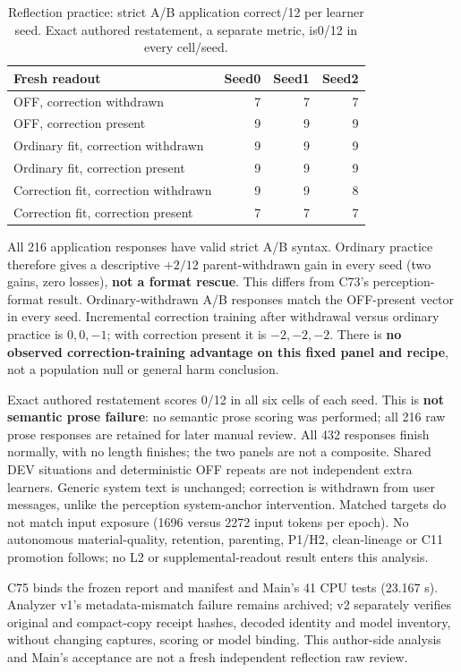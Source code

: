 \documentclass{article}
\begin{document}
\begin{table}[ht]
\centering
\caption{Reflection practice: strict A/B application correct/12 per learner
seed. Exact authored restatement, a separate metric, is0/12 in every cell/seed.}
\begin{tabular}{lrrr}
\toprule
Fresh readout & Seed0 & Seed1 & Seed2 \\
\midrule
OFF, correction withdrawn & 7 & 7 & 7 \\
OFF, correction present & 9 & 9 & 9 \\
Ordinary fit, correction withdrawn & 9 & 9 & 9 \\
Ordinary fit, correction present & 9 & 9 & 9 \\
Correction fit, correction withdrawn & 9 & 9 & 8 \\
Correction fit, correction present & 7 & 7 & 7 \\
\bottomrule
\end{tabular}
\end{table}

All 216 application responses have valid strict A/B syntax. Ordinary practice
therefore gives a descriptive $+2/12$ parent-withdrawn gain in every seed
(two gains, zero losses), \textbf{not a format rescue}. This differs from C73's
perception-format result. Ordinary-withdrawn A/B responses match the OFF-present
vector in every seed. Incremental correction training after withdrawal versus
ordinary practice is $0, 0, -1$; with correction present it is $-2, -2, -2$.
There is \textbf{no observed correction-training advantage on this fixed panel
and recipe}, not a population null or general harm conclusion.

Exact authored restatement scores 0/12 in all six cells of each seed. This is
\textbf{not semantic prose failure}: no semantic prose scoring was performed;
all 216 raw prose responses are retained for later manual review. All 432 responses
finish normally, with no length finishes; the two panels are not a composite.
Shared DEV situations and deterministic OFF repeats are not independent extra
learners. Generic system text is unchanged; correction is withdrawn from user
messages, unlike the perception system-anchor intervention. Matched targets do
not match input exposure (1696 versus 2272 input tokens per epoch). No autonomous
material-quality, retention, parenting, P1/H2, clean-lineage or C11 promotion
follows; no L2 or supplemental-readout result enters this analysis.

C75 binds the frozen report and manifest and Main's 41 CPU tests (23.167 s).
Analyzer v1's metadata-mismatch failure remains archived; v2 separately verifies
original and compact-copy receipt hashes, decoded identity and model inventory,
without changing captures, scoring or model binding. This author-side analysis
and Main's acceptance are not a fresh independent reflection raw review.
\end{document}
